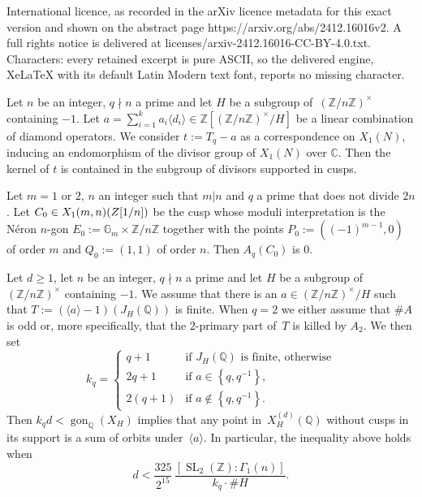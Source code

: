 \documentclass[10pt,a4paper]{amsart}
\DeclareMathOperator{\SL}{SL}
\DeclareMathOperator{\gon}{gon}
\def\torz#1{\mathbb Z /#1 \mathbb Z}
\newcommand{\C}{\mathbb{C}}
\newcommand{\Q}{\mathbb{Q}}
\newcommand{\Z}{\mathbb{Z}}
\newcommand{\diamondop}[1]{\langle #1 \rangle} %
\newcommand{\set}[1]{\left\lbrace #1 \right\rbrace}
\begin{document}
International licence, as recorded in the arXiv licence metadata for this exact version and shown on the abstract page https://arxiv.org/abs/2412.16016v2. A full rights notice is delivered at licenses/arxiv-2412.16016-CC-BY-4.0.txt. Characters: every retained excerpt is pure ASCII, so the delivered engine, XeLaTeX with its default Latin Modern text font, reports no missing character.
\begin{proposition}\label{prop:hecke-kernel}
Let $n$ be an integer, $q \nmid n$ a prime and let $H$ be a subgroup
  of~$(\Z/n\Z)^\times$ containing $-1$. Let $a=\sum_{i=1}^k a_i\diamondop{d_i} \in \Z[(\Z/n\Z)^\times/H]$ be a linear combination of diamond operators. We consider $t :=T_q - a$ 
as a correspondence on $X_1(N)$, inducing an endomorphism of the divisor group of $X_1(N)$
over $\C$. Then the kernel of $t$ is contained in the subgroup of divisors supported in cusps.
\end{proposition}

\begin{lemma}\label{lem:special_cusp}
Let $m=1$ or $2$, $n$ an integer such that $m|n$ and $q$ a prime that does not divide $2n$. Let $C_0 \in X_1(m,n)(\mathbb \Z[1/n])$ be the cusp whose moduli interpretation is the  N\'eron $n$-gon $E_0 := \mathbb G_m \times \torz{n}$ together with the points $P_0:=((-1)^{m-1},0)$ of order $m$ and $Q_0 :=(1,1)$ of order $n$. Then $A_q(C_0)$ is $0$.
\end{lemma}

\begin{proposition}[(Derickx)] \label{prop:hecke_gon}
  Let $d \ge 1$, let $n$ be an integer, $q \nmid n$ a prime and let $H$ be a subgroup
  of~$(\Z/n\Z)^\times$ containing $-1$. We assume that there is an $a \in (\Z/n\Z)^\times/ H$ such that $T := (\diamondop{a}-1)(J_H(\Q))$ is finite.
  When $q=2$ we either assume that $\#A$ is odd or, more specifically, that the $2$-primary part of~$T$ is killed by $A_2$.
  We then set
  \[ k_q = \begin{cases}
           q+1 & \text{if $J_H(\Q)$ is finite, otherwise} \\
           2q + 1 & \text{if $a \in \set{q, q^{-1}}$,} \\
           2(q + 1)& \text{if $a \notin \set{q, q^{-1}}$.}
         \end{cases}
  \]
  Then $k_qd < \gon_{\Q}(X_H)$ implies that any point
  in~$X_H^{(d)}(\Q)$ without cusps in its support is a sum of orbits
  under~$\diamondop{a}$. In particular, the inequality above holds when
  \begin{equation}\label{DS-inequality}
      d < \frac{325}{2^{15}} \, \frac{[\SL_2(\mathbb Z) :\Gamma_1(n)]}{k_q \cdot \#H}.
  \end{equation} 
\end{proposition}
\end{document}
